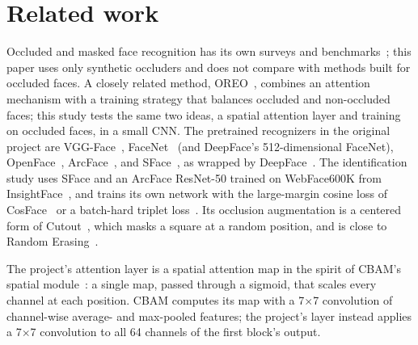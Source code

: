 \section{Related work}

Occluded and masked face recognition has its own surveys and benchmarks~\cite{zeng2021survey,deng2021mfr}; this paper uses only synthetic occluders and does not compare with methods built for occluded faces. A closely related method, OREO~\cite{xu2020oreo}, combines an attention mechanism with a training strategy that balances occluded and non-occluded faces; this study tests the same two ideas, a spatial attention layer and training on occluded faces, in a small CNN. The pretrained recognizers in the original project are VGG-Face~\cite{parkhi2015deep}, FaceNet~\cite{schroff2015facenet} (and DeepFace's 512-dimensional FaceNet), OpenFace~\cite{amos2016openface}, ArcFace~\cite{deng2019arcface}, and SFace~\cite{zhong2021sface}, as wrapped by DeepFace~\cite{serengil2020lightface}. The identification study uses SFace and an ArcFace ResNet-50 trained on WebFace600K from InsightFace~\cite{insightface}, and trains its own network with the large-margin cosine loss of CosFace~\cite{wang2018cosface} or a batch-hard triplet loss~\cite{hermans2017defense}. Its occlusion augmentation is a centered form of Cutout~\cite{devries2017cutout}, which masks a square at a random position, and is close to Random Erasing~\cite{zhong2020random}.

The project's attention layer is a spatial attention map in the spirit of CBAM's spatial module~\cite{woo2018cbam}: a single map, passed through a sigmoid, that scales every channel at each position. CBAM computes its map with a 7$\times$7 convolution of channel-wise average- and max-pooled features; the project's layer instead applies a 7$\times$7 convolution to all 64 channels of the first block's output.
